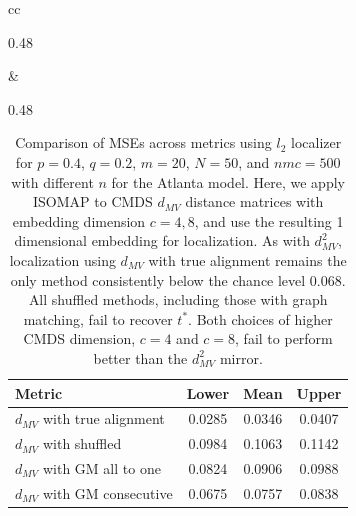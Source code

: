 \documentclass[12pt]{article}
\newcommand{\EE}{\mathbb{E}}
\newcommand{\PP}{\mathbb{P}}
\theoremstyle{definition}
\begin{document}
\begin{table}
\begin{tabular}{cc}
\begin{subtable}[t]{0.48\textwidth}
\end{subtable}
&
\begin{subtable}[t]{0.48\textwidth}
\centering
\begin{tabular}{lccc}
\hline
\textbf{Metric} & \textbf{Lower} & \textbf{Mean} & \textbf{Upper} \\
\hline
$d_{MV}$ with true alignment & 0.0285 & 0.0346 & 0.0407 \\
$d_{MV}$ with shuffled        & 0.0984 & 0.1063 & 0.1142 \\
$d_{MV}$ with GM all to one       & 0.0824 & 0.0906 & 0.0988 \\
$d_{MV}$ with GM consecutive      & 0.0675 & 0.0757 & 0.0838 \\
\hline
\end{tabular}
\caption{c = 8, $n = 800$}
\end{subtable}
\end{tabular}

\vspace{3mm}
\caption{
Comparison of MSEs across metrics using $l_2$ localizer for $p = 0.4$, $q = 0.2$, $m = 20$, $N = 50$, and $nmc = 500$ with different $n$ for the Atlanta model.
Here, we apply ISOMAP to CMDS $d_{MV}$ distance matrices with embedding dimension $c = 4, 8$, and use the resulting 1 dimensional embedding for localization.
As with $d_{MV}^2$, localization using $d_{MV}$ with true alignment remains the only method consistently below the chance level $0.068$. All shuffled methods, including those with graph matching, fail to recover $t^*$. 
Both choices of higher CMDS dimension, $c=4$ and $c=8$, fail to perform better than the $d^2_{MV}$ mirror. 
}
\label{tab:A-appendix}
\end{table}










\end{document}
